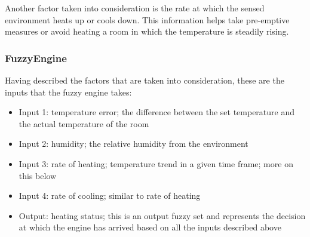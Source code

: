 \documentclass[conference]{IEEEtran}
\let\Oldsubsubsection\subsubsection
\renewcommand{\subsubsection}{\FloatBarrier\Oldsubsubsection}
\begin{document}
Another factor taken into consideration is the rate at which the sensed environment heats up or cools down. This
information helps take pre-emptive measures or avoid heating a room in which the temperature is steadily rising.

\subsubsection{FuzzyEngine}
\label{Thermostat fuzzy engine}

Having described the factors that are taken into consideration, these are the inputs that the fuzzy engine takes:\par
\begin{itemize}
\item Input 1: temperature error; the difference between the set temperature and the actual temperature of the room
\item Input 2: humidity; the relative humidity from the environment
\item Input 3: rate of heating; temperature trend in a given time frame; more on this below
\item Input 4: rate of cooling; similar to rate of heating
\item Output: heating status; this is an output fuzzy set and represents the decision at which the engine has arrived
based on all the inputs described above
\end{itemize}
\end{document}
